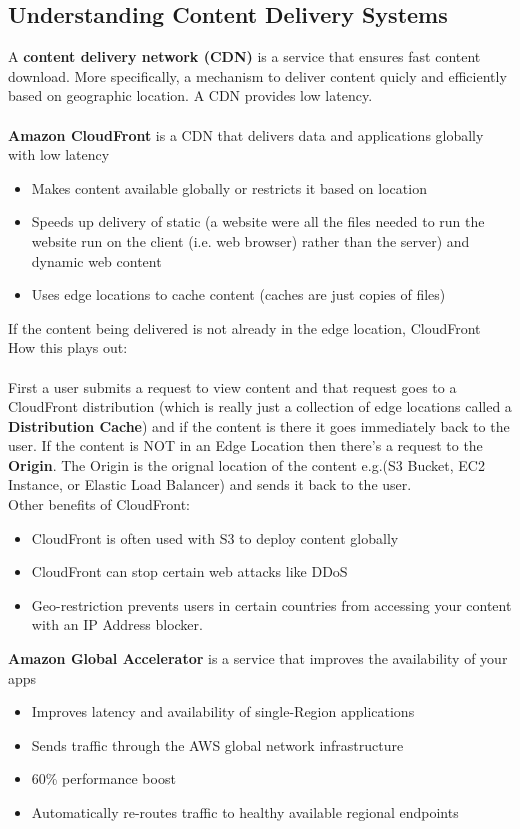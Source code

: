 \documentclass{article}%
\begin{document}
\subsection{Understanding Content Delivery Systems}
A \textbf{content delivery network (CDN)} is a service that ensures fast content download. More specifically, a mechanism to deliver content quicly and efficiently based on geographic location. A CDN provides low latency. \\ \\
\textbf{Amazon CloudFront} is a CDN that delivers data and applications globally with low latency
\begin{itemize}
    \item Makes content available globally or restricts it based on location
    \item Speeds up delivery of static (a website were all the files needed to run the website run on the client (i.e. web browser) rather than the server) and dynamic web content
    \item Uses edge locations to cache content (caches are just copies of files)
\end{itemize}
If the content being delivered is not already in the edge location, CloudFront 
How this plays out: \\ \\
First a user submits a request to view content and that request goes to a CloudFront distribution (which is really just a collection of edge locations called a \textbf{Distribution Cache}) and if the content is there
it goes immediately back to the user. If the content is NOT in an Edge Location then there's a request to the \textbf{Origin}. The Origin is the orignal
location of the content e.g.(S3 Bucket, EC2 Instance, or Elastic Load Balancer) and sends it back to the user. \\
Other benefits of CloudFront: 
\begin{itemize}
    \item CloudFront is often used with S3 to deploy content globally
    \item CloudFront can stop certain web attacks like DDoS
    \item Geo-restriction prevents users in certain countries from accessing your content with an IP Address blocker.
\end{itemize}

\textbf{Amazon Global Accelerator} is a service that improves the availability of your apps
\begin{itemize}
    \item Improves latency and availability of single-Region applications
    \item Sends traffic through the AWS global network infrastructure
    \item 60\% performance boost
    \item Automatically re-routes traffic to healthy available regional endpoints
\end{itemize}
\end{document}
